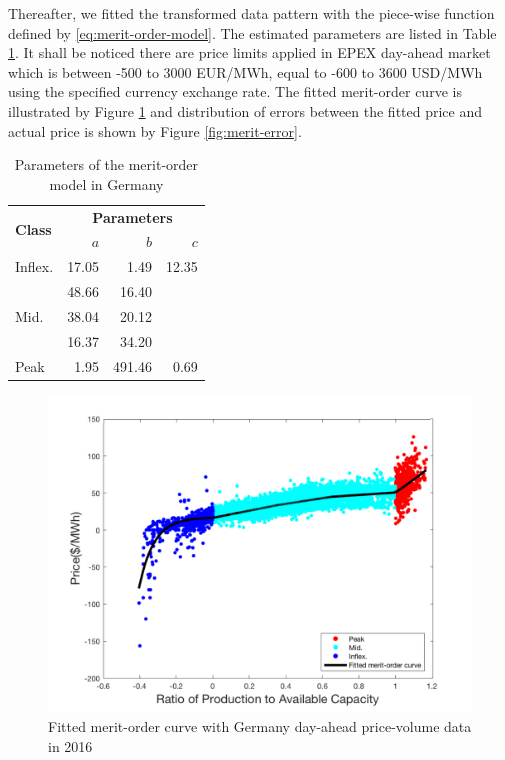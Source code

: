 Thereafter, we fitted the transformed data pattern with the piece-wise function defined by \eqref{eq:merit-order-model}. The estimated parameters are listed in Table \ref{tab:merit}. It shall be noticed there are price limits applied in EPEX day-ahead market\cite{EPEX_price_limit} which is between -500 to 3000 EUR/MWh, equal to -600 to 3600 USD/MWh using the specified currency exchange rate. The fitted merit-order curve is illustrated by Figure \ref{fig:merit-fitted} and distribution of errors between the fitted price and actual price is shown by Figure \ref{fig:merit-error}.

\begin{table}[h!]
	\centering
	\begin{tabular}{l  r r r}
		\hline
		\multirow{2}{*}{\textbf{Class}} & \multicolumn{3}{c}{\textbf{Parameters}}\\
		& $a$ & $b$ & $c$\\
		\hline
		Inflex. & 17.05 & 1.49 & 12.35 \\
		\multirow{3}{*}{Mid.} & 48.66 & 16.40 & \\
		\multirow{3}{*}{} & 38.04 & 20.12 & \\
		\multirow{3}{*}{} & 16.37 & 34.20 & \\
		Peak & 1.95 & 491.46 & 0.69 \\
		\hline
	\end{tabular}
	\caption{Parameters of the merit-order model in Germany}\label{tab:merit}
\end{table}

\begin{figure}[h!]
	\centering
	\includegraphics[width=0.95\linewidth]{Figures/Merit-order-fitted}
	\caption{Fitted merit-order curve with Germany day-ahead price-volume data in 2016}
	\label{fig:merit-fitted}
\end{figure}

